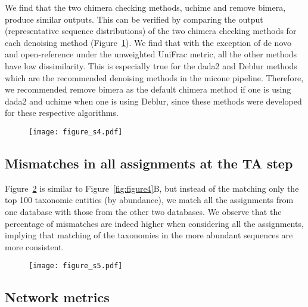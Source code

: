     We find that the two chimera checking methods, uchime and remove bimera, produce similar outputs.
    This can be verified by comparing the output (representative sequence distributions) of the two chimera checking methods for each denoising method (Figure~\ref{fig:figure_s4}).
    We find that with the exception of de novo and open-reference under the unweighted UniFrac metric, all the other methods have low dissimilarity.
    This is especially true for the \ac{dada2} and Deblur methods which are the recommended denoising methods in the \ac{micone} pipeline.
    Therefore, we recommended remove bimera as the default chimera method if one is using \ac{dada2} and uchime when one is using Deblur, since these methods were developed for these respective algorithms.

    \begin{figure}[H]
      \centering
      \texttt{[image: figure\_s4.pdf]}
    \end{figure}
    \begin{figure}[H]
      \centering
        \caption{
        }
      \label{fig:figure_s4}
    \end{figure}
    \FloatBarrier
    \newpage

  \subsection*{Mismatches in all assignments at the \ac{TA} step}

    Figure~\ref{fig:figure_s5} is similar to Figure~\ref{fig:figure4}B, but instead of the matching only the top 100 taxonomic entities (by abundance), we match all the assignments from one database with those from the other two databases.
    We observe that the percentage of mismatches are indeed higher when considering all the assignments, implying that matching of the taxonomies in the more abundant sequences are more consistent.

    \begin{figure}[H]
      \centering
      \texttt{[image: figure\_s5.pdf]}
    \end{figure}
    \begin{figure}[H]
      \centering
        \caption{
        }
      \label{fig:figure_s5}
    \end{figure}
    \FloatBarrier
    \newpage

  \subsection*{Network metrics}

